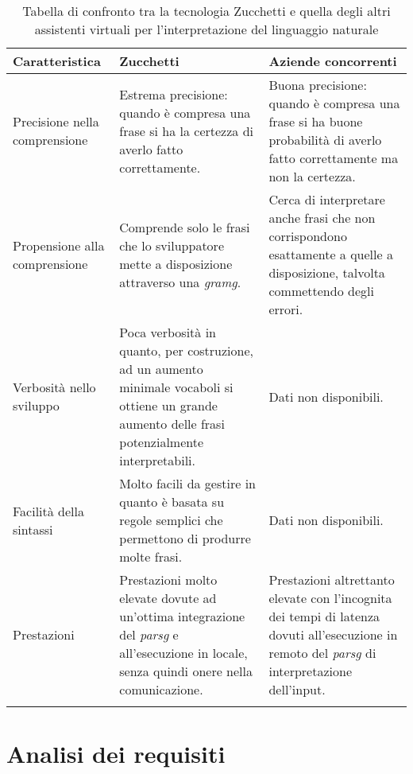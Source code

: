 	\begin{longtable}{|p{3cm}|p{4.5cm}|p{4.5cm}|}
		\hline
		\textbf{Caratteristica} & \textbf{Zucchetti} & \textbf{Aziende concorrenti} \\\hline
		
		Precisione nella comprensione & Estrema precisione: quando è compresa una frase si ha la certezza di averlo fatto correttamente.  & Buona precisione: quando è compresa una frase si ha buone probabilità di averlo fatto correttamente ma non la certezza. \\
		\hline
		Propensione alla comprensione & Comprende solo le frasi che lo sviluppatore mette a disposizione attraverso una \emph{\gls{gramg}}. & Cerca di interpretare anche frasi che non corrispondono esattamente a quelle a disposizione, talvolta commettendo degli errori. \\
		\hline
		Verbosità nello sviluppo & Poca verbosità in quanto, per costruzione, ad un aumento minimale vocaboli si ottiene un grande aumento delle frasi potenzialmente interpretabili. & Dati non disponibili. \\
		\hline
		Facilità della sintassi & Molto facili da gestire in quanto è basata su regole semplici che permettono di produrre molte frasi. & Dati non disponibili. \\
		\hline
		Prestazioni & Prestazioni molto elevate dovute ad un'ottima integrazione del \emph{\gls{parsg}} e all'esecuzione in locale, senza quindi onere nella comunicazione. & Prestazioni altrettanto elevate con l'incognita dei tempi di latenza dovuti all'esecuzione in remoto del \emph{\gls{parsg}} di interpretazione dell'input. \\
		\hline
		\caption{Tabella di confronto tra la tecnologia Zucchetti e quella degli altri assistenti virtuali per l'interpretazione del linguaggio naturale}
	\end{longtable}

\section{Analisi dei requisiti}
